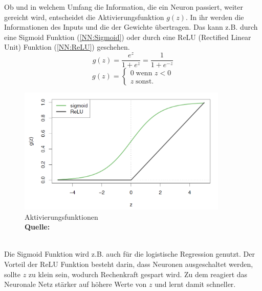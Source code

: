 \documentclass[a4paper,12pt]{thesis}
\newcommand*{\captionsource}[2]{%
	\caption[{#1}]{%
		#1%
		\\\hspace{\linewidth}%
		\textbf{Quelle:} #2%
	}%
}
\begin{document}
Ob und in welchem Umfang die Information, die ein Neuron passiert, weiter gereicht wird, entscheidet die Aktivierungsfunktion $g(z)$. In ihr werden die Informationen des Inputs und die der Gewichte übertragen. Das kann z.B. durch eine Sigmoid Funktion (\ref{NN:Sigmoid}) oder durch eine ReLU (Rectified Linear Unit) Funktion (\ref{NN:ReLU}) geschehen.
\begin{equation}
	\label{NN:Sigmoid}
	g(z)=\frac{e^z}{1+e^z}=\frac{1}{1+e^{-z}}
\end{equation}
\begin{equation}
	\label{NN:ReLU}
	g(z)=\begin{cases}
		0 \; \text{wenn $z<0$}
		\\
		z \; \text{sonst}.
	\end{cases}
\end{equation}
\begin{figure}[!ht]
	\centering
	\includegraphics[width=10cm]{Plots/NN2.png}
	\captionsource{Aktivierungsfunktionen}{
		\cite{James2013DL}
	}
	\label{NN2}
\end{figure}\\
Die Sigmoid Funktion wird z.B. auch für die logistische Regression genutzt. Der Vorteil der ReLU Funktion besteht darin, dass Neuronen ausgeschaltet werden, sollte $z$ zu klein sein, wodurch Rechenkraft gespart wird. Zu dem reagiert das Neuronale Netz stärker auf höhere Werte von $z$ und lernt damit schneller.
\end{document}
